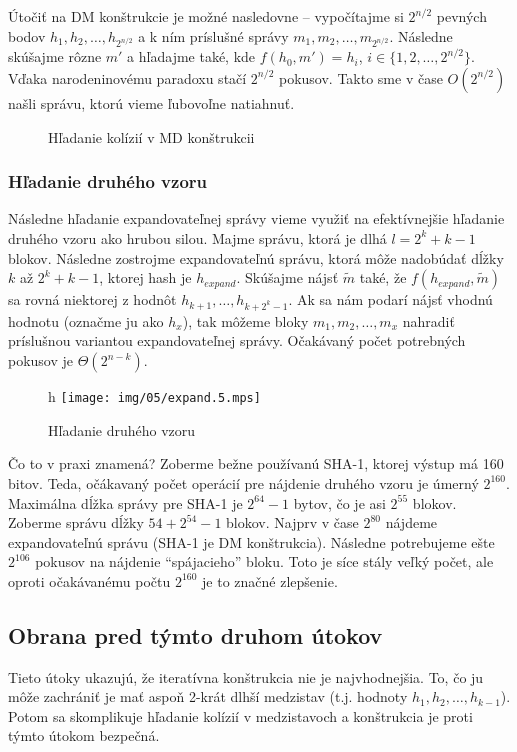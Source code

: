 Útočiť na DM konštrukcie je možné nasledovne -- vypočítajme si $2^{n/2}$ 
pevných bodov $h_1, h_2, \dots, h_{2^{n/2}}$ a k ním príslušné správy
$m_1, m_2, \dots, m_{2^{n/2}}$. 
Následne skúšajme rôzne $m'$ a hľadajme také, kde $f(h_0, m') = h_i$,
$i \in \{1, 2, \dots, 2^{n/2}\}$.
Vďaka narodeninovému paradoxu stačí $2^{n/2}$ pokusov.
Takto sme v čase $O(2^{n/2})$ našli správu, ktorú
vieme ľubovoľne natiahnuť.
\begin{figure}[h!]
    \centering

    \caption{Hľadanie kolízií v MD konštrukcii}
\end{figure}

\subsubsection{Hľadanie druhého vzoru}
Následne hľadanie expandovateľnej správy vieme využiť na efektívnejšie
hľadanie druhého vzoru ako hrubou silou.
Majme správu, ktorá je dlhá $l=2^k + k - 1$ blokov.
Následne zostrojme expandovateľnú správu, ktorá môže nadobúdať dĺžky $k$
až $2^k + k -1$, ktorej hash je $h_{expand}$.
Skúšajme nájsť  $\tilde{m}$ také, že $f(h_{expand}, \tilde{m})$ 
sa rovná niektorej z hodnôt $h_{k+1}, \dots, h_{k+2^k-1}$.
Ak sa nám podarí nájsť vhodnú hodnotu
(označme ju ako $h_x$), tak môžeme bloky $m_1, m_2, \dots, m_x$ 
nahradiť príslušnou variantou expandovateľnej správy.
Očakávaný počet potrebných pokusov je $\Theta(2^{n-k})$. 

\begin{figure}{h}
    \centering
    \texttt{[image: img/05/expand.5.mps]}
    \caption{Hľadanie druhého vzoru}
\end{figure}

Čo to v praxi znamená? Zoberme bežne používanú SHA-1, 
ktorej výstup má 160 bitov. Teda,
očákavaný počet operácií pre nájdenie druhého vzoru je úmerný $2^{160}$.
Maximálna dĺžka správy pre SHA-1 je $2^{64} - 1$ bytov,
čo je asi $2^{55}$ blokov.
Zoberme správu dĺžky $54 + 2^{54} - 1$ blokov.
Najprv v čase $2^{80}$ nájdeme expandovateľnú správu (SHA-1 je DM konštrukcia).
Následne potrebujeme ešte $2^{106}$ pokusov na nájdenie 
``spájacieho'' bloku.
Toto je síce stály veľký počet, ale oproti očakávanému počtu $2^{160}$
je to značné zlepšenie.

\subsection{Obrana pred týmto druhom útokov}
Tieto útoky ukazujú, že iteratívna konštrukcia nie je najvhodnejšia.
To, čo ju môže zachrániť je mať aspoň 2-krát dlhší medzistav 
(t.j. hodnoty $h_1, h_2, \dots, h_{k-1}$). Potom sa skomplikuje hľadanie
kolízií v medzistavoch a konštrukcia je proti týmto útokom bezpečná.


